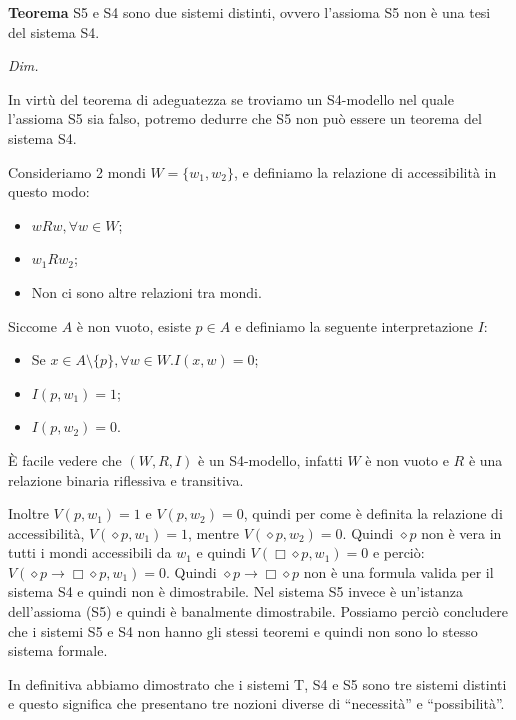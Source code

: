 \documentclass[a4paper, 12pt]{article}
\begin{document}
\begin{flushleft}
\textbf{Teorema}
S5 e S4 sono due sistemi distinti, ovvero l'assioma S5 non è una tesi del sistema S4.

\textit{Dim.}

In virtù del teorema di adeguatezza se troviamo un S4-modello nel quale l'assioma S5
sia falso, potremo dedurre che S5 non può essere un teorema del sistema S4.

Consideriamo 2 mondi $W = \{w_1, w_2\}$, e definiamo la relazione di accessibilità
in questo modo:
\begin{itemize}
    \item $wRw, \forall w \in W$;
    \item $w_1Rw_2$;
    \item Non ci sono altre relazioni tra mondi.
\end{itemize}

Siccome $A$ è non vuoto, esiste $p \in A$ e definiamo la seguente interpretazione $I:$
\begin{itemize}
    \item Se $x \in A \setminus \{p\}, \forall w \in W. I(x, w) = 0$;
    \item $I(p, w_1) = 1$;
    \item $I(p, w_2) = 0$.
\end{itemize}

È facile vedere che $(W, R, I)$ è un S4-modello, infatti $W$ è non vuoto e
$R$ è una relazione binaria riflessiva e transitiva.

Inoltre $V(p, w_1) = 1$ e $V(p, w_2) = 0$, quindi per come è definita
la relazione di accessibilità, $V(\diamond p, w_1) = 1$, mentre
$V(\diamond p, w_2) = 0$. Quindi $\diamond p$ non è vera in tutti i mondi accessibili da $w_1$
e quindi $V(\Box \diamond p, w_1) = 0$ e perciò: $V(\diamond p \rightarrow \Box\diamond p, w_1) = 0$.
Quindi $\diamond p \rightarrow \Box\diamond p$ non è una formula valida per il sistema S4 e quindi
non è dimostrabile.
Nel sistema S5 invece è un'istanza dell'assioma (S5) e quindi è banalmente dimostrabile.
Possiamo perciò concludere che i sistemi S5 e S4 non hanno gli stessi teoremi e quindi non
sono lo stesso sistema formale.


\end{flushleft}

In definitiva abbiamo dimostrato che i sistemi T, S4 e S5 sono tre sistemi distinti
e questo significa che presentano tre nozioni diverse di ``necessità'' e ``possibilità''.
\end{document}
